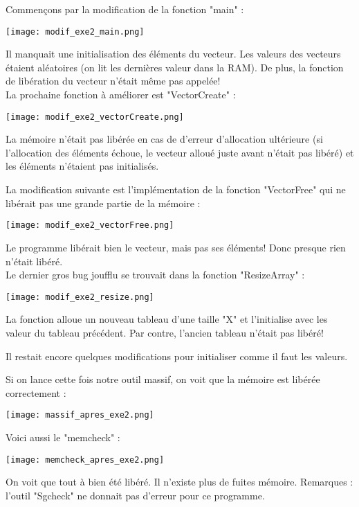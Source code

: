 Commençons par la modification de la fonction "main" :
\begin{center} 
\hspace{15cm}
\texttt{[image: modif\_exe2\_main.png]}
\end{center}
\vspace{0.5cm}

Il manquait une initialisation des éléments du vecteur. Les valeurs des vecteurs étaient aléatoires (on lit les dernières valeur dans la RAM). De plus, la fonction de libération du vecteur n'était même pas appelée!\\

La prochaine fonction à améliorer est "VectorCreate" :
\begin{center} 
\hspace{15cm}
\texttt{[image: modif\_exe2\_vectorCreate.png]}
\end{center}
\vspace{0.5cm}
La mémoire n'était pas libérée en cas de d'erreur d'allocation ultérieure (si l'allocation des éléments échoue, le vecteur alloué juste avant n'était pas libéré) et les éléments n'étaient pas initialisés.
\pagebreak

La modification suivante est l'implémentation de la fonction "VectorFree" qui ne libérait pas une grande partie de la mémoire :
\begin{center} 
\hspace{15cm}
\texttt{[image: modif\_exe2\_vectorFree.png]}
\end{center}
\vspace{0.5cm}
Le programme libérait bien le vecteur, mais pas ses éléments! Donc presque rien n'était libéré.\\

Le dernier gros bug joufflu se trouvait dans la fonction "ResizeArray"  :
\begin{center} 
\hspace{15cm}
\texttt{[image: modif\_exe2\_resize.png]}
\end{center}
\vspace{0.5cm}
La fonction alloue un nouveau tableau d'une taille "X" et l'initialise avec les valeur du tableau précédent. Par contre, l'ancien tableau n'était pas libéré!

Il restait encore quelques modifications pour initialiser comme il faut les valeurs. 

\pagebreak 
Si on lance cette fois notre outil massif, on voit que la mémoire est libérée correctement : 
\begin{center} 
\hspace{15cm}
\texttt{[image: massif\_apres\_exe2.png]}
\end{center}
\vspace{0.5cm}

Voici aussi le "memcheck" : 
\begin{center} 
\hspace{15cm}
\texttt{[image: memcheck\_apres\_exe2.png]}
\end{center}
\vspace{0.5cm}
On voit que tout à bien été libéré. Il n'existe plus de fuites mémoire. Remarques :  l'outil "Sgcheck" ne donnait pas d'erreur pour ce programme.


